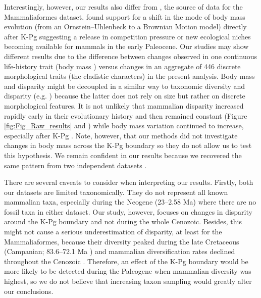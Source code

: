 \documentclass[10pt,letterpaper]{article}
\begin{document}
Interestingly, however, our results also differ from \cite{Slater2012MEE}, the source of data for the Mammaliaformes dataset.
\cite{Slater2012MEE} found support for a shift in the mode of body mass evolution (from an Ornstein--Uhlenbeck to a Brownian Motion model) directly after K-Pg suggesting a release in competition pressure or new ecological niches becoming available for mammals in the early Paleocene.
Our studies may show different results due to the difference between changes observed in one continuous life-history trait (body mass \cite{Slater2012MEE}) versus changes in an aggregate of 446 discrete morphological traits (the cladistic characters) in the present analysis.
Body mass and disparity might be decoupled in a similar way to taxonomic diversity and disparity (e.g. \cite{slaterCetacean,ruta2013,hopkinsdecoupling2013}) because the latter does not rely on size but rather on discrete morphological features.
It is not unlikely that mammalian disparity increased rapidly early in their evolutionary history and then remained constant (Figure \ref{fig:Fig_Raw_results} and \cite{Close2015,Lee2015R759}) while body mass variation continued to increase, especially after K-Pg \cite{Slater2012MEE}.
Note, however, that our methods did not investigate changes in body mass across the K-Pg boundary so they do not allow us to test this hypothesis.
We remain confident in our results because we recovered the same pattern from two independent datasets \cite{Slater2012MEE,beckancient2014}.

There are several caveats to consider when interpreting our results. 
Firstly, both our datasets are limited taxonomically.
They do not represent all known mammalian taxa, especially during the Neogene (23--2.58 Ma) where there are no fossil taxa in either dataset.
Our study, however, focuses on changes in disparity around the K-Pg boundary and not during the whole Cenozoic.
Besides, this might not cause a serious underestimation of disparity, at least for the Mammaliaformes, because their diversity peaked during the late Cretaceous (Campanian; 83.6--72.1 Ma \cite{Newham201432}) and mammalian diversification rates declined throughout the Cenozoic \cite{Raia2012}.
Therefore, an effect of the K-Pg boundary would be more likely to be detected during the Paleogene when mammalian diversity was highest, so we do not believe that increasing taxon sampling would greatly alter our conclusions.
\end{document}
